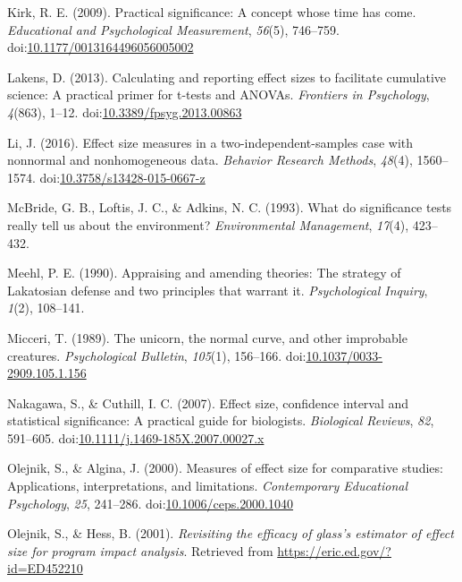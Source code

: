 \documentclass[
  man]{apa6}
\begin{document}
\leavevmode\hypertarget{ref-Kirk_2009}{}%
Kirk, R. E. (2009). Practical significance: A concept whose time has come. \emph{Educational and Psychological Measurement}, \emph{56}(5), 746--759. doi:\href{https://doi.org/10.1177/0013164496056005002\%20}{10.1177/0013164496056005002 }

\leavevmode\hypertarget{ref-Lakens_2013}{}%
Lakens, D. (2013). Calculating and reporting effect sizes to facilitate cumulative science: A practical primer for t-tests and ANOVAs. \emph{Frontiers in Psychology}, \emph{4}(863), 1--12. doi:\href{https://doi.org/10.3389/fpsyg.2013.00863}{10.3389/fpsyg.2013.00863}

\leavevmode\hypertarget{ref-Li_2016}{}%
Li, J. (2016). Effect size measures in a two-independent-samples case with nonnormal and nonhomogeneous data. \emph{Behavior Research Methods}, \emph{48}(4), 1560--1574. doi:\href{https://doi.org/10.3758/s13428-015-0667-z}{10.3758/s13428-015-0667-z}

\leavevmode\hypertarget{ref-McBride_et_al_1993}{}%
McBride, G. B., Loftis, J. C., \& Adkins, N. C. (1993). What do significance tests really tell us about the environment? \emph{Environmental Management}, \emph{17}(4), 423--432.

\leavevmode\hypertarget{ref-Meehl_1990}{}%
Meehl, P. E. (1990). Appraising and amending theories: The strategy of Lakatosian defense and two principles that warrant it. \emph{Psychological Inquiry}, \emph{1}(2), 108--141.

\leavevmode\hypertarget{ref-Micceri_1989}{}%
Micceri, T. (1989). The unicorn, the normal curve, and other improbable creatures. \emph{Psychological Bulletin}, \emph{105}(1), 156--166. doi:\href{https://doi.org/10.1037/0033-2909.105.1.156}{10.1037/0033-2909.105.1.156}

\leavevmode\hypertarget{ref-Nakagawa_and_Cuthill_2007}{}%
Nakagawa, S., \& Cuthill, I. C. (2007). Effect size, confidence interval and statistical significance: A practical guide for biologists. \emph{Biological Reviews}, \emph{82}, 591--605. doi:\href{https://doi.org/10.1111/j.1469-185X.2007.00027.x}{10.1111/j.1469-185X.2007.00027.x}

\leavevmode\hypertarget{ref-Olejnik_Algina_2000}{}%
Olejnik, S., \& Algina, J. (2000). Measures of effect size for comparative studies: Applications, interpretations, and limitations. \emph{Contemporary Educational Psychology}, \emph{25}, 241--286. doi:\href{https://doi.org/10.1006/ceps.2000.1040}{10.1006/ceps.2000.1040}

\leavevmode\hypertarget{ref-Olejnik_Hess_2001}{}%
Olejnik, S., \& Hess, B. (2001). \emph{Revisiting the efficacy of glass's estimator of effect size for program impact analysis}. Retrieved from \url{https://eric.ed.gov/?id=ED452210}
\end{document}
